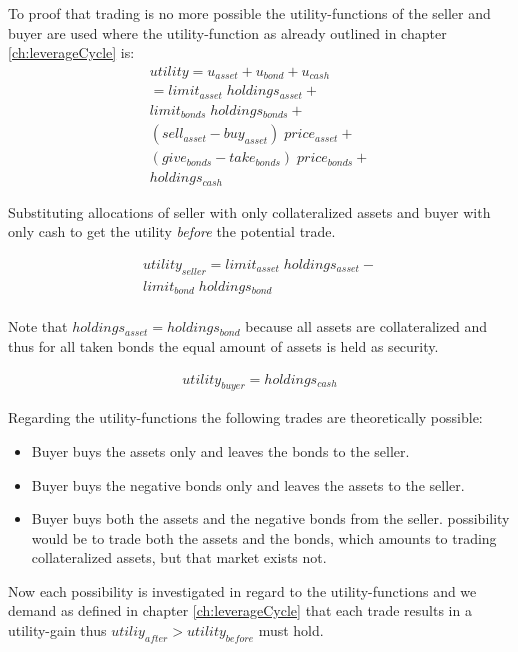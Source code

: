 \documentclass[Bachelorarbeit.tex]{subfiles}
\begin{document}
To proof that trading is no more possible the utility-functions of the seller and buyer are used where the utility-function as already outlined in chapter \ref{ch:leverageCycle} is:
\begin{align*}
	utility = u_{asset} + u_{bond} + u_{cash}
	\\ = limit_{asset} \; holdings_{asset} + \\
			limit_{bonds} \; holdings_{bonds} + \\
			(sell_{asset} - buy_{asset}) \; price_{asset} + \\
			(give_{bonds} - take_{bonds}) \; price_{bonds} + \\
			holdings_{cash} 
\end{align*}

Substituting allocations of seller with only collateralized assets and buyer with only cash to get the utility \textit{before} the potential trade.

\begin{align*}
	utility_{seller} = limit_{asset} \; holdings_{asset} - \\
			limit_{bond} \; holdings_{bond} \\
\end{align*}

Note that $holdings_{asset} = holdings_{bond}$ because all assets are collateralized and thus for all taken bonds the equal amount of assets is held as security.

\begin{align*}
	utility_{buyer} = holdings_{cash} 
\end{align*}

Regarding the utility-functions the following trades are theoretically possible:
\begin{itemize}
\item Buyer buys the assets only and leaves the bonds to the seller.
\item Buyer buys the negative bonds only and leaves the assets to the seller.
\item Buyer buys both the assets and the negative bonds from the seller. possibility would be to trade both the assets and the bonds, which amounts to trading collateralized assets, but that market exists not.
\end{itemize}

Now each possibility is investigated in regard to the utility-functions and we demand as defined in chapter \ref{ch:leverageCycle} that each trade results in a utility-gain thus $utiliy_{after} > utility_{before}$ must hold.
\end{document}
